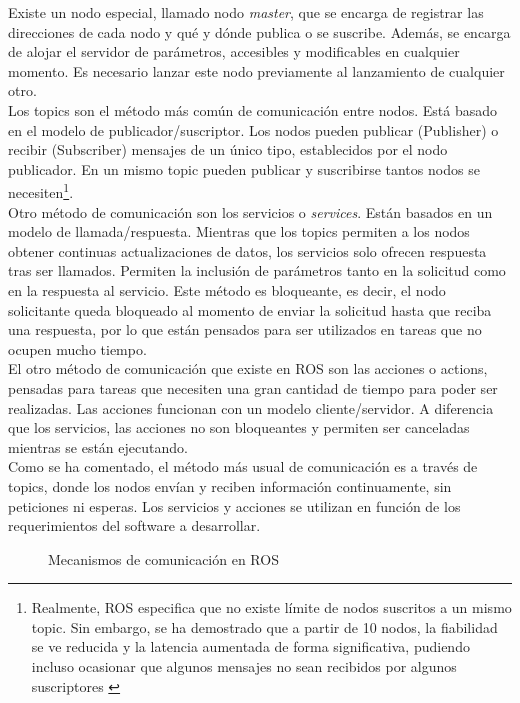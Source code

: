 Existe un nodo especial, llamado nodo \textit{master}, que se encarga de registrar las direcciones de cada nodo y qué y dónde publica o se suscribe. Además, se encarga de alojar el servidor de parámetros, accesibles y modificables en cualquier momento. Es necesario lanzar este nodo previamente al lanzamiento de cualquier otro. \\

Los topics son el método más común de comunicación entre nodos. Está basado en el modelo de publicador/suscriptor. Los nodos pueden publicar (Publisher) o recibir (Subscriber) mensajes de un único tipo, establecidos por el nodo publicador. En un mismo topic pueden publicar y suscribirse tantos nodos se necesiten\footnote{Realmente, ROS especifica que no existe límite de nodos suscritos a un mismo topic. Sin embargo, se ha demostrado que a partir de 10 nodos, la fiabilidad se ve reducida y la latencia aumentada de forma significativa, pudiendo incluso ocasionar que algunos mensajes no sean recibidos por algunos suscriptores \cite{issue}}. \\

Otro método de comunicación son los servicios o \textit{services}. Están basados en un modelo de llamada/respuesta. Mientras que los topics permiten a los nodos obtener continuas actualizaciones de datos, los servicios solo ofrecen respuesta tras ser llamados. Permiten la inclusión de parámetros tanto en la solicitud como en la respuesta al servicio. Este método es bloqueante, es decir, el nodo solicitante queda bloqueado al momento de enviar la solicitud hasta que reciba una respuesta, por lo que están pensados para ser utilizados en tareas que no ocupen mucho tiempo.\\

El otro método de comunicación que existe en ROS son las acciones o actions, pensadas para tareas que necesiten una gran cantidad de tiempo para poder ser realizadas. Las acciones funcionan con un modelo cliente/servidor. A diferencia que los servicios, las acciones no son bloqueantes y permiten ser canceladas mientras se están ejecutando.\\

Como se ha comentado, el método más usual de comunicación es a través de topics, donde los nodos envían y reciben información continuamente, sin peticiones ni esperas. Los servicios y acciones se utilizan en función de los requerimientos del software a desarrollar.\\

\begin{figure}[H]
 \centering
  \hspace{0.5cm}
 \caption{Mecanismos de comunicación en ROS}
 \label{fig:comm}
\end{figure}

